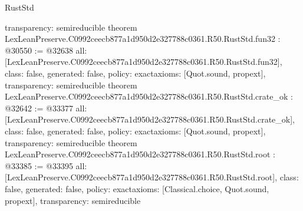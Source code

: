 \begin{lexlean}{RustStd}
\begin{coremodule}
{  transparency: semireducible
}
theorem LexLeanPreserve.C0992ceecb877a1d950d2e327788c0361.R50.RustStd.fun32 : @30550 := @32638 {
  all: [LexLeanPreserve.C0992ceecb877a1d950d2e327788c0361.R50.RustStd.fun32],
  class: false,
  generated: false,
  policy: exact{axioms: [Quot.sound, propext]},
  transparency: semireducible
}
theorem LexLeanPreserve.C0992ceecb877a1d950d2e327788c0361.R50.RustStd.crate_ok : @32642 := @33377 {
  all: [LexLeanPreserve.C0992ceecb877a1d950d2e327788c0361.R50.RustStd.crate_ok],
  class: false,
  generated: false,
  policy: exact{axioms: [Quot.sound, propext]},
  transparency: semireducible
}
theorem LexLeanPreserve.C0992ceecb877a1d950d2e327788c0361.R50.RustStd.root : @33385 := @33395 {
  all: [LexLeanPreserve.C0992ceecb877a1d950d2e327788c0361.R50.RustStd.root],
  class: false,
  generated: false,
  policy: exact{axioms: [Classical.choice, Quot.sound, propext]},
  transparency: semireducible
}


\end{coremodule}
\end{lexlean}
